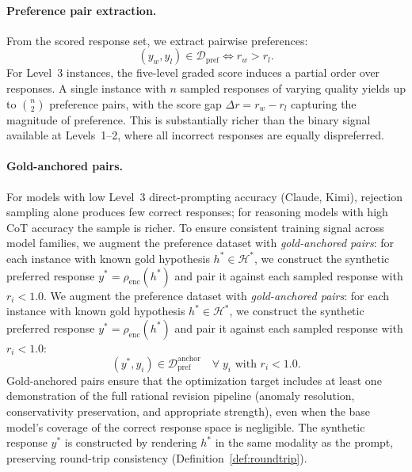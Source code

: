 \documentclass{article}
\theoremstyle{definition}
\newcommand{\Hgold}{\mathcal{H}^{*}}
\begin{document}
\paragraph{Preference pair extraction.} From the scored response set, we extract pairwise preferences:
\begin{equation}\label{eq:pref_pair}
    (y_w, y_l) \in \mathcal{D}_{\mathrm{pref}} \iff r_w > r_l.
\end{equation}
For Level~3 instances, the five-level graded score induces a partial order over responses. A single instance with $n$ sampled responses of varying quality yields up to $\binom{n}{2}$ preference pairs, with the score gap $\Delta r = r_w - r_l$ capturing the magnitude of preference. This is substantially richer than the binary signal available at Levels~1--2, where all incorrect responses are equally dispreferred.

\paragraph{Gold-anchored pairs.} For models with low Level~3 direct-prompting accuracy (Claude, Kimi), rejection sampling alone produces few correct responses; for reasoning models with high CoT accuracy the sample is richer. To ensure consistent training signal across model families, we augment the preference dataset with \emph{gold-anchored pairs}: for each instance with known gold hypothesis $h^* \in \Hgold$, we construct the synthetic preferred response $y^* = \rho_{\mathrm{enc}}(h^*)$ and pair it against each sampled response with $r_i < 1.0$. We augment the preference dataset with \emph{gold-anchored pairs}: for each instance with known gold hypothesis $h^* \in \Hgold$, we construct the synthetic preferred response $y^* = \rho_{\mathrm{enc}}(h^*)$ and pair it against each sampled response with $r_i < 1.0$:
\begin{equation}\label{eq:gold_anchor}
    (y^*, y_i) \in \mathcal{D}_{\mathrm{pref}}^{\mathrm{anchor}} \quad \forall\; y_i \text{ with } r_i < 1.0.
\end{equation}
Gold-anchored pairs ensure that the optimization target includes at least one demonstration of the full rational revision pipeline (anomaly resolution, conservativity preservation, and appropriate strength), even when the base model's coverage of the correct response space is negligible. The synthetic response $y^*$ is constructed by rendering $h^*$ in the same modality as the prompt, preserving round-trip consistency (Definition~\ref{def:roundtrip}).
\end{document}
